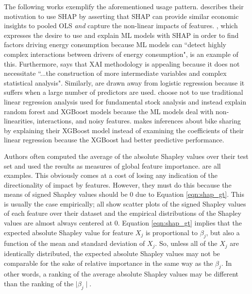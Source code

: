 \documentclass[mnsc,blindrev]{informs3}
\begin{document}
    The following works exemplify the aforementioned usage pattern. \cite{berger2023supply} describes their motivation to use SHAP by asserting that SHAP can provide similar economic insights to pooled OLS \emph{and} capture the non-linear impacts of features. \cite{srivastava23energy}, which expresses the desire to use and explain ML models with SHAP in order to find factors driving energy consumption because ML models can ``detect highly complex interactions between drivers of energy consumption", is an example of this. Furthermore, \cite{zhou23consumption} says that XAI methodology is appealing because it does not necessitate ``...the construction of more intermediate variables and complex statistical analysis". Similarly, \cite{banulescu2023practical} are drawn away from logistic regression because it suffers when a large number of predictors are used. \cite{hanauer22boosting} choose not to use traditional linear regression analysis used for fundamental stock analysis and instead explain random forest and XGBoost models because the ML models deal with non-linearities, interactions, and noisy features. \cite{li24roles} makes inferences about bike sharing by explaining their XGBoost model instead of examining the coefficients of their linear regression because the XGBoost had better predictive performance. 

    Authors often computed the average of the absolute Shapley values over their test set and used the results as measures of global feature importance. \cite{lenaers23rent,maeng23vr,guenther2023useful} are all examples. This obviously comes at a cost of losing any indication of the directionality of impact by features. However, they must do this because the means of signed Shapley values should be 0 due to Equation \ref{eqn:shap_gt}. This is usually the case empirically; \citep{lenaers23rent,maeng23vr,jiang24churn} all show scatter plots of the signed Shapley values of each feature over their dataset and the empirical distributions of the Shapley values are almost always centered at 0. Equation \ref{eqn:shap_gt} implies that the expected absolute Shapley value for feature $X_j$ is proportional to $\beta_j$, but also a function of the mean and standard deviation of $X_j$. So, unless all of the $X_j$ are identically distributed, the expected absolute Shapley values may not be comparable for the sake of relative importance in the same way as the $\beta_j$. In other words, a ranking of the average absolute Shapley values may be different than the ranking of the $\mid \beta_j\mid$.  %
\end{document}
